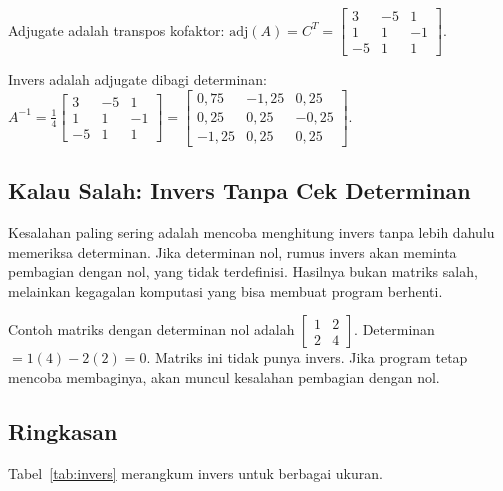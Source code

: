 \documentclass[11pt,a4paper]{article}
\begin{document}
Adjugate adalah transpos kofaktor: $\text{adj}(A)=C^T=\begin{bmatrix}3&-5&1\\1&1&-1\\-5&1&1\end{bmatrix}$.

Invers adalah adjugate dibagi determinan: $A^{-1}=\frac{1}{4}\begin{bmatrix}3&-5&1\\1&1&-1\\-5&1&1\end{bmatrix}=\begin{bmatrix}0{,}75&-1{,}25&0{,}25\\0{,}25&0{,}25&-0{,}25\\-1{,}25&0{,}25&0{,}25\end{bmatrix}$.

\subsection{Kalau Salah: Invers Tanpa Cek Determinan}

Kesalahan paling sering adalah mencoba menghitung invers tanpa lebih dahulu memeriksa determinan. Jika determinan nol, rumus invers akan meminta pembagian dengan nol, yang tidak terdefinisi. Hasilnya bukan matriks salah, melainkan kegagalan komputasi yang bisa membuat program berhenti.

Contoh matriks dengan determinan nol adalah $\begin{bmatrix}1&2\\2&4\end{bmatrix}$. Determinan $=1(4)-2(2)=0$. Matriks ini tidak punya invers. Jika program tetap mencoba membaginya, akan muncul kesalahan pembagian dengan nol.

\subsection{Ringkasan}

Tabel~\ref{tab:invers} merangkum invers untuk berbagai ukuran.
\end{document}

